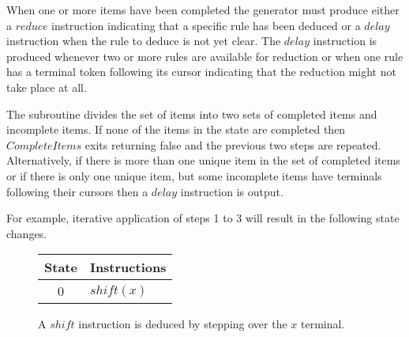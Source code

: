 \documentclass[a4paper,11pt]{article}
\begin{document}
\begin{enumerate}
When one or more items have been completed the generator must produce either a $reduce$ instruction indicating that a specific rule has been deduced or a $delay$ instruction when the rule to deduce is not yet clear.
The $delay$ instruction is produced whenever two or more rules are available for reduction or when one rule has a terminal token following its cursor indicating that the reduction might not take place at all.

The subroutine divides the set of items into two sets of completed items and incomplete items.
If none of the items in the state are completed then $CompleteItems$ exits returning false and the previous two steps are repeated.
Alternatively, if there is more than one unique item in the set of completed items or if there is only one unique item, but some incomplete items have terminals following their cursors then a $delay$ instruction is output.
\end{enumerate}

For example, iterative application of steps 1 to 3 will result in the following state changes.

\begin{figure}[!ht]
\centering
{}

\vspace{.5\baselineskip}
\small{\begin{tabular}{|c|l|}
  \hline
  \textbf{State} & \textbf{Instructions} \\
  \hline
  0 & $shift(x)$ \\ 
  \hline
\end{tabular}}
\caption{A $shi\!ft$ instruction is deduced by stepping over the $x$ terminal.}
\end{figure}
\end{document}
